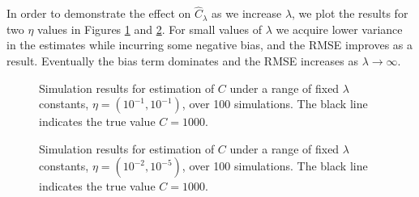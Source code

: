 \documentclass[12pt]{article}
\theoremstyle{break}
\theoremstyle{break}
\begin{document}
In order to demonstrate the effect on $\widehat{C}_{\lambda}$ as we increase $\lambda$, we plot the results for two $\eta$ values in Figures \ref{fig:fixed_lambda} and \ref{fig:fixed_lambda_2}.  For small values of $\lambda$ we acquire lower variance in the estimates while incurring some negative bias, and the RMSE improves as a result.  Eventually the bias term dominates and the RMSE increases as $\lambda \to \infty$.


\begin{figure}[p]
\caption{Simulation results for estimation of $C$ under a range of fixed $\lambda$ constants, $\eta = (10^{-1}, 10^{-1})$, over 100 simulations. The black line indicates the true value $C = 1000$.
\label{fig:fixed_lambda}}
\centering{}
\end{figure}


\begin{figure}[p]
\caption{Simulation results for estimation of $C$ under a range of fixed $\lambda$ constants, $\eta = (10^{-2}, 10^{-5})$, over 100 simulations.  The black line indicates the true value $C = 1000$.
\label{fig:fixed_lambda_2}}
\centering{}
\end{figure}
\end{document}
